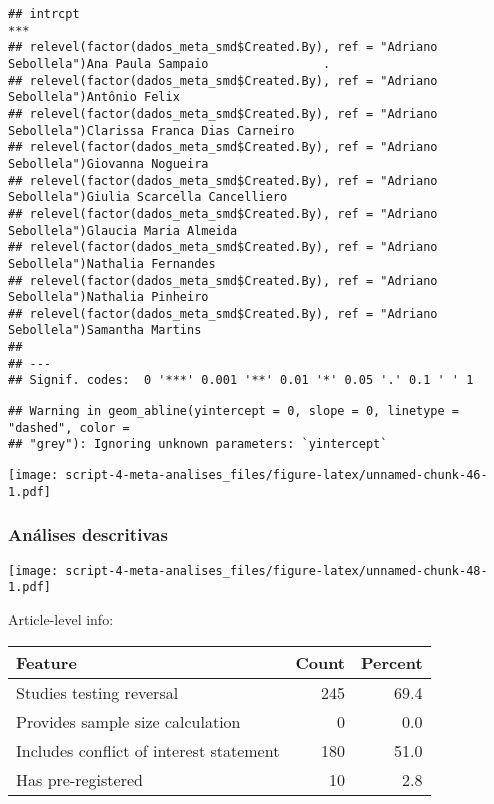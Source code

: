 \documentclass[
]{article}
\begin{document}
\begin{verbatim}
## intrcpt                                                                                             *** 
## relevel(factor(dados_meta_smd$Created.By), ref = "Adriano Sebollela")Ana Paula Sampaio                . 
## relevel(factor(dados_meta_smd$Created.By), ref = "Adriano Sebollela")Antônio Felix                      
## relevel(factor(dados_meta_smd$Created.By), ref = "Adriano Sebollela")Clarissa Franca Dias Carneiro      
## relevel(factor(dados_meta_smd$Created.By), ref = "Adriano Sebollela")Giovanna Nogueira                  
## relevel(factor(dados_meta_smd$Created.By), ref = "Adriano Sebollela")Giulia Scarcella Cancelliero       
## relevel(factor(dados_meta_smd$Created.By), ref = "Adriano Sebollela")Glaucia Maria Almeida              
## relevel(factor(dados_meta_smd$Created.By), ref = "Adriano Sebollela")Nathalia Fernandes                 
## relevel(factor(dados_meta_smd$Created.By), ref = "Adriano Sebollela")Nathalia Pinheiro                  
## relevel(factor(dados_meta_smd$Created.By), ref = "Adriano Sebollela")Samantha Martins                   
## 
## ---
## Signif. codes:  0 '***' 0.001 '**' 0.01 '*' 0.05 '.' 0.1 ' ' 1
\end{verbatim}

\begin{verbatim}
## Warning in geom_abline(yintercept = 0, slope = 0, linetype = "dashed", color =
## "grey"): Ignoring unknown parameters: `yintercept`
\end{verbatim}

\texttt{[image: script-4-meta-analises\_files/figure-latex/unnamed-chunk-46-1.pdf]}

\hypertarget{anuxe1lises-descritivas}{%
\subsubsection{Análises descritivas}\label{anuxe1lises-descritivas}}

\texttt{[image: script-4-meta-analises\_files/figure-latex/unnamed-chunk-48-1.pdf]}

Article-level info:

\begin{longtable}[]{@{}lrr@{}}
\toprule()
Feature & Count & Percent \\
\midrule()
\endhead
Studies testing reversal & 245 & 69.4 \\
Provides sample size calculation & 0 & 0.0 \\
Includes conflict of interest statement & 180 & 51.0 \\
Has pre-registered & 10 & 2.8 \\
\bottomrule()
\end{longtable}
\end{document}
